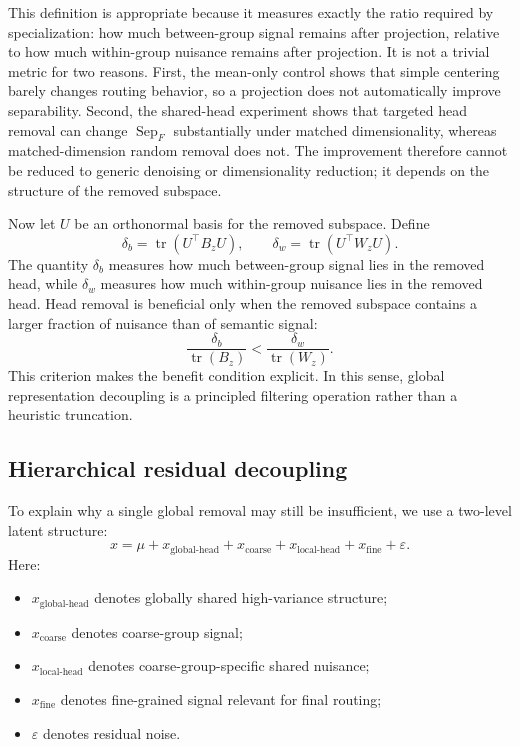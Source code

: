 \documentclass[11pt]{article}
\begin{document}
This definition is appropriate because it measures exactly the ratio required by specialization: how much between-group signal remains after projection, relative to how much within-group nuisance remains after projection. It is not a trivial metric for two reasons. First, the mean-only control shows that simple centering barely changes routing behavior, so a projection does not automatically improve separability. Second, the shared-head experiment shows that targeted head removal can change $\operatorname{Sep}_F$ substantially under matched dimensionality, whereas matched-dimension random removal does not. The improvement therefore cannot be reduced to generic denoising or dimensionality reduction; it depends on the structure of the removed subspace.

Now let $U$ be an orthonormal basis for the removed subspace. Define
\[
\delta_b = \operatorname{tr}(U^\top B_z U),
\qquad
\delta_w = \operatorname{tr}(U^\top W_z U).
\]
The quantity $\delta_b$ measures how much between-group signal lies in the removed head, while $\delta_w$ measures how much within-group nuisance lies in the removed head. Head removal is beneficial only when the removed subspace contains a larger fraction of nuisance than of semantic signal:
\[
\frac{\delta_b}{\operatorname{tr}(B_z)} < \frac{\delta_w}{\operatorname{tr}(W_z)}.
\]
This criterion makes the benefit condition explicit. In this sense, global representation decoupling is a principled filtering operation rather than a heuristic truncation.

\subsection{Hierarchical residual decoupling}

To explain why a single global removal may still be insufficient, we use a two-level latent structure:
\[
x
=
\mu
+
x_{\text{global-head}}
+
x_{\text{coarse}}
+
x_{\text{local-head}}
+
x_{\text{fine}}
+
\varepsilon .
\]
Here:
\begin{itemize}[leftmargin=1.5em]
    \item $x_{\text{global-head}}$ denotes globally shared high-variance structure;
    \item $x_{\text{coarse}}$ denotes coarse-group signal;
    \item $x_{\text{local-head}}$ denotes coarse-group-specific shared nuisance;
    \item $x_{\text{fine}}$ denotes fine-grained signal relevant for final routing;
    \item $\varepsilon$ denotes residual noise.
\end{itemize}
\end{document}
